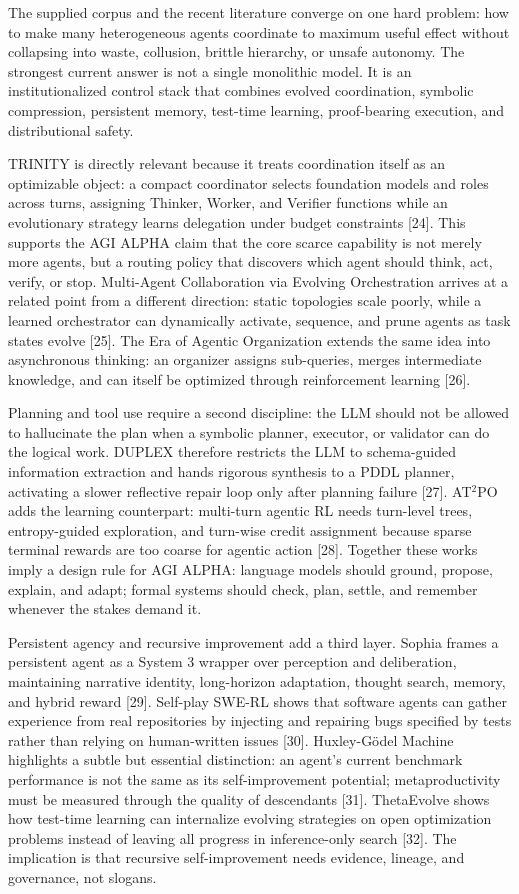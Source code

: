\documentclass[
  11pt,
]{article}
\begin{document}
The supplied corpus and the recent literature converge on one hard problem: how to make many heterogeneous agents coordinate to maximum useful effect without collapsing into waste, collusion, brittle hierarchy, or unsafe autonomy. The strongest current answer is not a single monolithic model. It is an institutionalized control stack that combines evolved coordination, symbolic compression, persistent memory, test-time learning, proof-bearing execution, and distributional safety.

TRINITY is directly relevant because it treats coordination itself as an optimizable object: a compact coordinator selects foundation models and roles across turns, assigning Thinker, Worker, and Verifier functions while an evolutionary strategy learns delegation under budget constraints [24]. This supports the AGI ALPHA claim that the core scarce capability is not merely more agents, but a routing policy that discovers which agent should think, act, verify, or stop. Multi-Agent Collaboration via Evolving Orchestration arrives at a related point from a different direction: static topologies scale poorly, while a learned orchestrator can dynamically activate, sequence, and prune agents as task states evolve [25]. The Era of Agentic Organization extends the same idea into asynchronous thinking: an organizer assigns sub-queries, merges intermediate knowledge, and can itself be optimized through reinforcement learning [26].

Planning and tool use require a second discipline: the LLM should not be allowed to hallucinate the plan when a symbolic planner, executor, or validator can do the logical work. DUPLEX therefore restricts the LLM to schema-guided information extraction and hands rigorous synthesis to a PDDL planner, activating a slower reflective repair loop only after planning failure [27]. AT$^2$PO adds the learning counterpart: multi-turn agentic RL needs turn-level trees, entropy-guided exploration, and turn-wise credit assignment because sparse terminal rewards are too coarse for agentic action [28]. Together these works imply a design rule for AGI ALPHA: language models should ground, propose, explain, and adapt; formal systems should check, plan, settle, and remember whenever the stakes demand it.

Persistent agency and recursive improvement add a third layer. Sophia frames a persistent agent as a System 3 wrapper over perception and deliberation, maintaining narrative identity, long-horizon adaptation, thought search, memory, and hybrid reward [29]. Self-play SWE-RL shows that software agents can gather experience from real repositories by injecting and repairing bugs specified by tests rather than relying on human-written issues [30]. Huxley-Gödel Machine highlights a subtle but essential distinction: an agent's current benchmark performance is not the same as its self-improvement potential; metaproductivity must be measured through the quality of descendants [31]. ThetaEvolve shows how test-time learning can internalize evolving strategies on open optimization problems instead of leaving all progress in inference-only search [32]. The implication is that recursive self-improvement needs evidence, lineage, and governance, not slogans.
\end{document}
